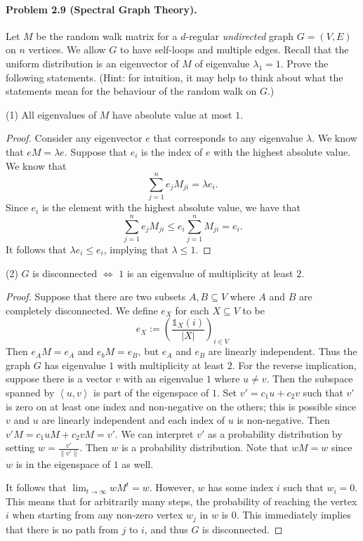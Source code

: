\paragraph{Problem 2.9 (Spectral Graph Theory).} Let $M$ be the random walk matrix for  a $d$-regular \textit{undirected} graph $G=(V,E)$ on $n$ vertices. We allow $G$ to have self-loops and multiple edges. Recall that the uniform distribution is an eigenvector of $M$ of eigenvalue $\lambda_1=1$. Prove the following statements. (Hint: for intuition, it may help to think about what the statements mean for the behaviour of the random walk on $G$.)

(1) All eigenvalues of $M$ have absolute value at most $1$.

\begin{proof}
	Consider any eigenvector $e$ that corresponds to any eigenvalue $\lambda$. We know that $eM=\lambda e$. Suppose that $e_i$ is the index of $e$ with the highest absolute value. We know that
	$$\sum_{j=1}^{n}e_jM_{ji}=\lambda e_i.$$
	Since $e_i$ is the element with the highest absolute value, we have that 
	$$\sum_{j=1}^{n}e_jM_{ji}\leq e_i\sum_{j=1}^nM_{ji}=e_i.$$
	It follows that $\lambda e_i\leq e_i$, implying that $\lambda\leq 1$.
\end{proof}

(2) $G$ is disconnected $\iff$ $1$ is an eigenvalue of multiplicity at least $2$.

\begin{proof}
	Suppose that there are two subsets $A,B\subseteq V$ where $A$ and $B$ are completely disconnected. We define $e_X$ for each $X\subseteq V$ to be
	$$e_X := \left(\frac{\mathds{1}_X(i)}{|X|}\right)_{i\in V}$$
	Then $e_AM = e_A$ and $e_bM = e_B$, but $e_A$ and $e_B$ are linearly independent. Thus the graph $G$ has eigenvalue $1$ with multiplicity at least $2$. For the reverse implication, suppose there is a vector $v$ with an eigenvalue $1$ where $u\neq v$. Then the subspace spanned by $\left\langle u,v\right\rangle$ is part of the eigenspace of $1$. Set $v'=c_1u+c_2v$ such that $v'$ is zero on at least one index and non-negative on the others; this is possible since $v$ and $u$ are linearly independent and each index of $u$ is non-negative. Then $v'M = c_1uM + c_2vM = v'$. We can interpret $v'$ as a probability distribution by setting $w=\frac{v'}{\|v'\|}$. Then $w$ is a probability distribution. Note that $wM = w$ since $w$ is in the eigenspace of $1$ as well.
	
	 It follows that $\lim_{t\rightarrow\infty} wM^{t}=w$. However, $w$ has some index $i$ such that $w_i=0$. This means that for arbitrarily many steps, the probability of reaching the vertex $i$ when starting from any non-zero vertex $w_j$ in $w$ is $0$. This immediately implies that there is no path from $j$ to $i$, and thus $G$ is disconnected.
\end{proof}

